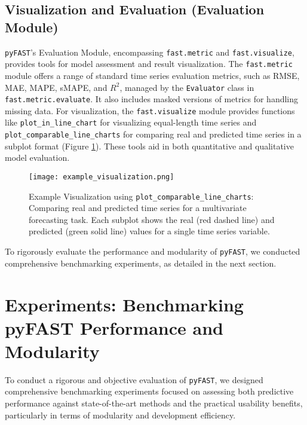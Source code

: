 \documentclass[twoside,11pt]{article}
\begin{document}
\subsection{Visualization and Evaluation (Evaluation Module)}

\texttt{pyFAST}'s Evaluation Module, encompassing \texttt{fast.metric} and \texttt{fast.visualize}, provides tools for model assessment and result visualization. The \texttt{fast.metric} module offers a range of standard time series evaluation metrics, such as RMSE, MAE, MAPE, sMAPE, and $R^2$, managed by the \texttt{Evaluator} class in \texttt{fast.metric.evaluate}.  It also includes masked versions of metrics for handling missing data.  For visualization, the \texttt{fast.visualize} module provides functions like \texttt{plot\_in\_line\_chart} for visualizing equal-length time series and \texttt{plot\_comparable\_line\_charts} for comparing real and predicted time series in a subplot format (Figure \ref{fig:example_visualization}).  These tools aid in both quantitative and qualitative model evaluation.

\begin{figure}[h]
    \centering
    \texttt{[image: example\_visualization.png]} %
    \caption{Example Visualization using \texttt{plot\_comparable\_line\_charts}: Comparing real and predicted time series for a multivariate forecasting task. Each subplot shows the real (red dashed line) and predicted (green solid line) values for a single time series variable.}
    \label{fig:example_visualization}
\end{figure}

To rigorously evaluate the performance and modularity of \texttt{pyFAST}, we conducted comprehensive benchmarking experiments, as detailed in the next section.






\section{Experiments: Benchmarking pyFAST Performance and Modularity}
To conduct a rigorous and objective evaluation of \texttt{pyFAST}, we designed comprehensive benchmarking experiments focused on assessing both predictive performance against state-of-the-art methods and the practical usability benefits, particularly in terms of modularity and development efficiency.
\end{document}
